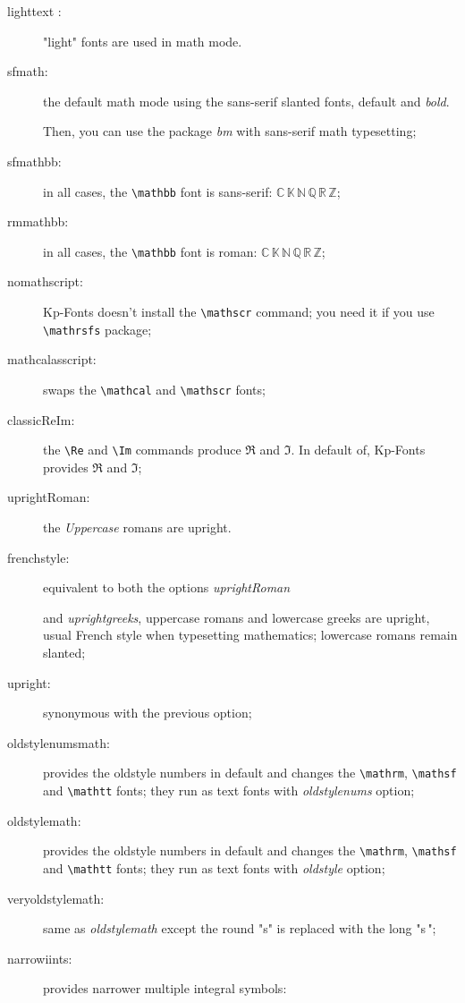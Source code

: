\documentclass[a4paper,11pt]{article}
\begin{document}
\begin{description}

	\item[lighttext :] "light" fonts are used in math mode.
  \item[sfmath:] the default math mode using the sans-serif slanted fonts, default and \textit{bold}.
  
       Then, you can use the package \textit{bm} with sans-serif math typesetting;
  \item[sfmathbb:] in all cases, the \verb=\mathbb= font is sans-serif:
        { $\mathbb{C\,K\,N\,Q\,R\,Z}$};
  \item[rmmathbb:] in all cases, the \verb=\mathbb= font is roman:
        { $\mathbb{C\,K\,N\,Q\,R\,Z}$};
	\item[nomathscript:] Kp-Fonts doesn't install the \verb=\mathscr= command; you need it if you use \verb=\mathrsfs=
				package;
	\item[mathcalasscript:] swaps the \verb=\mathcal= and \verb=\mathscr= fonts;
	\item[classicReIm:] the \verb=\Re= and \verb=\Im= commands produce $\mathfrak{R}$ and $\mathfrak{I}$. In default of, Kp-Fonts provides $\Re$ and $\Im$;
	\item[uprightRoman:] the \textit{Uppercase} romans are upright.
	\item[frenchstyle:] equivalent to both the options \textit{uprightRoman} 
	
	and \textit{uprightgreeks}, uppercase romans and lowercase greeks are upright, usual French style when typesetting mathematics; lowercase romans remain slanted;
	\item[upright:] synonymous with the previous option;
	\item[oldstylenumsmath:] provides the oldstyle numbers in default and changes the \verb=\mathrm=,
				\verb=\mathsf= and \verb=\mathtt= fonts; they run as text fonts with \textit{oldstylenums} option;
	\item[oldstylemath:] provides the oldstyle numbers in default and changes the \verb=\mathrm=,
				\verb=\mathsf= and \verb=\mathtt= fonts; they run as text fonts with \textit{oldstyle} option;
	\item[veryoldstylemath:] same as \textit{oldstylemath} except the round "s"
		is replaced with the long "{\selectfont s}\,";
	\item[narrowiints:] provides narrower multiple integral symbols:
	

\end{description}
\end{document}
